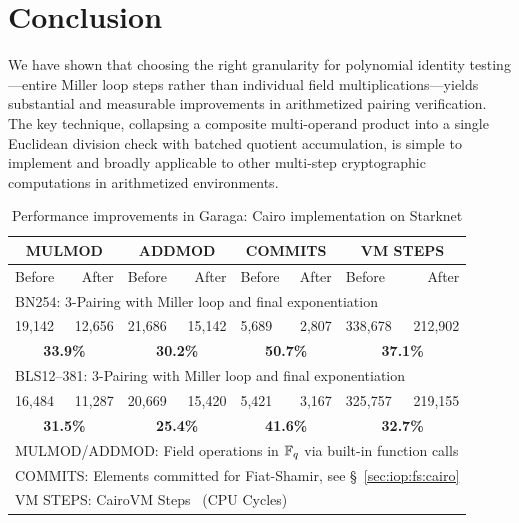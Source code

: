 \section{Conclusion}

We have shown that choosing the right granularity for polynomial identity
testing---entire Miller loop steps rather than individual field
multiplications---yields substantial and measurable improvements in
arithmetized pairing verification.
The key technique, collapsing a composite multi-operand product into a single
Euclidean division check with batched quotient accumulation, is simple to
implement and broadly applicable to other multi-step cryptographic computations
in arithmetized environments.


\begin{table}[t]
\centering
\caption{Performance improvements in Garaga: Cairo implementation on Starknet}
\label{tab:garaga_performance}
\begin{tabular}{|l r|l r|l r|l r|}
\hline
\multicolumn{2}{|c|}{\textbf{MULMOD}} & \multicolumn{2}{|c|}{\textbf{ADDMOD}} & \multicolumn{2}{|c|}{\textbf{COMMITS}} & \multicolumn{2}{|c|}{\textbf{VM STEPS}} \\
\hline

Before & After & Before & After & Before & After & Before & After \\
\hline

\multicolumn{8}{l}{\footnotesize BN254: 3-Pairing with Miller loop and final exponentiation} \\

\hline
19,142 & 12,656 & 21,686 & 15,142 & 5,689 & 2,807 & 338,678 & 212,902 \\

\multicolumn{2}{|c}{\textbf{33.9\%}} & \multicolumn{2}{|c}{\textbf{30.2\%}} & \multicolumn{2}{|c}{\textbf{50.7\%}} & \multicolumn{2}{|c|}{\textbf{37.1\%}} \\

\hline

\multicolumn{8}{l}{\footnotesize BLS12--381: 3-Pairing with Miller loop and final exponentiation} \\
\hline
16,484 & 11,287 & 20,669 & 15,420 & 5,421 & 3,167 & 325,757 & 219,155 \\
\multicolumn{2}{|c}{\textbf{31.5\%}} & \multicolumn{2}{|c}{\textbf{25.4\%}} & \multicolumn{2}{|c}{\textbf{41.6\%}} & \multicolumn{2}{|c|}{\textbf{32.7\%}} \\
\hline
\multicolumn{8}{l}{\footnotesize MULMOD/ADDMOD\@: Field operations in $\mathbb{F}_q$ via built-in function calls} \\
\multicolumn{8}{l}{\footnotesize COMMITS\@: Elements committed for Fiat-Shamir, see \S~\ref{sec:iop:fs:cairo}} \\
\multicolumn{8}{l}{\footnotesize VM STEPS\@: CairoVM Steps~\cite{cairo} (CPU Cycles)} \\
\hline
\end{tabular}
\end{table}

